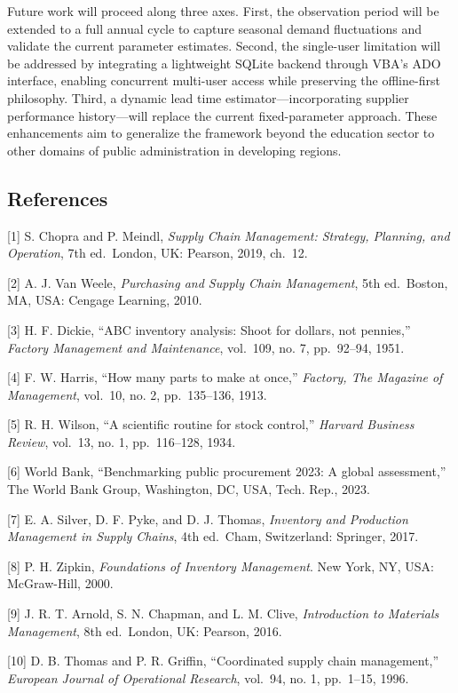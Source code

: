 ﻿\documentclass[conference]{IEEEtran}
\begin{document}
Future work will proceed along three axes. First, the observation period
will be extended to a full annual cycle to capture seasonal demand
fluctuations and validate the current parameter estimates. Second, the
single-user limitation will be addressed by integrating a lightweight
SQLite backend through VBA's ADO interface, enabling concurrent
multi-user access while preserving the offline-first philosophy. Third,
a dynamic lead time estimator---incorporating supplier performance
history---will replace the current fixed-parameter approach. These
enhancements aim to generalize the framework beyond the education sector
to other domains of public administration in developing regions.

\subsection{References}\label{references}

{[}1{]} S. Chopra and P. Meindl, \emph{Supply Chain Management:
Strategy, Planning, and Operation}, 7th ed.~London, UK: Pearson, 2019,
ch.~12.

{[}2{]} A. J. Van Weele, \emph{Purchasing and Supply Chain Management},
5th ed.~Boston, MA, USA: Cengage Learning, 2010.

{[}3{]} H. F. Dickie, ``ABC inventory analysis: Shoot for dollars, not
pennies,'' \emph{Factory Management and Maintenance}, vol.~109, no. 7,
pp.~92--94, 1951.

{[}4{]} F. W. Harris, ``How many parts to make at once,'' \emph{Factory,
The Magazine of Management}, vol.~10, no. 2, pp.~135--136, 1913.

{[}5{]} R. H. Wilson, ``A scientific routine for stock control,''
\emph{Harvard Business Review}, vol.~13, no. 1, pp.~116--128, 1934.

{[}6{]} World Bank, ``Benchmarking public procurement 2023: A global
assessment,'' The World Bank Group, Washington, DC, USA, Tech. Rep.,
2023.

{[}7{]} E. A. Silver, D. F. Pyke, and D. J. Thomas, \emph{Inventory and
Production Management in Supply Chains}, 4th ed.~Cham, Switzerland:
Springer, 2017.

{[}8{]} P. H. Zipkin, \emph{Foundations of Inventory Management}. New
York, NY, USA: McGraw-Hill, 2000.

{[}9{]} J. R. T. Arnold, S. N. Chapman, and L. M. Clive,
\emph{Introduction to Materials Management}, 8th ed.~London, UK:
Pearson, 2016.

{[}10{]} D. B. Thomas and P. R. Griffin, ``Coordinated supply chain
management,'' \emph{European Journal of Operational Research}, vol.~94,
no. 1, pp.~1--15, 1996.
\end{document}
